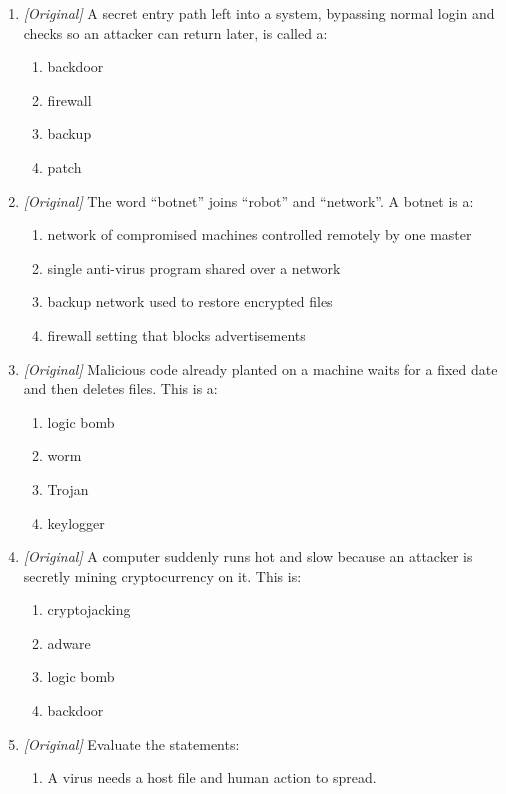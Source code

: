 \documentclass[11pt]{article}
\begin{document}
\begin{enumerate}[label=\textbf{Q\arabic*.}, leftmargin=*]
\begin{enumerate}[label=\Alph*.]
  \end{enumerate}
\item \textit{[Original]} A secret entry path left into a system, bypassing
  normal login and checks so an attacker can return later, is called a:
  \begin{enumerate}[label=\Alph*.]
    \item backdoor
    \item firewall
    \item backup
    \item patch
  \end{enumerate}
\item \textit{[Original]} The word ``botnet'' joins ``robot'' and
  ``network''. A botnet is a:
  \begin{enumerate}[label=\Alph*.]
    \item network of compromised machines controlled remotely by one master
    \item single anti-virus program shared over a network
    \item backup network used to restore encrypted files
    \item firewall setting that blocks advertisements
  \end{enumerate}
\item \textit{[Original]} Malicious code already planted on a machine waits
  for a fixed date and then deletes files. This is a:
  \begin{enumerate}[label=\Alph*.]
    \item logic bomb
    \item worm
    \item Trojan
    \item keylogger
  \end{enumerate}
\item \textit{[Original]} A computer suddenly runs hot and slow because an
  attacker is secretly mining cryptocurrency on it. This is:
  \begin{enumerate}[label=\Alph*.]
    \item cryptojacking
    \item adware
    \item logic bomb
    \item backdoor
  \end{enumerate}
\item \textit{[Original]} Evaluate the statements:
  \begin{enumerate}[label=\Roman*.]
    \item A virus needs a host file and human action to spread.

\end{enumerate}
\end{enumerate}
\end{document}
